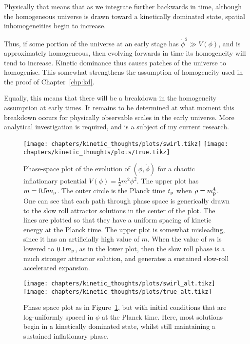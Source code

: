 Physically that means that as we integrate further backwards in time, although the homogeneous universe is drawn toward a kinetically dominated state, spatial inhomogeneities begin to increase.

Thus, if some portion of the universe at an early stage has \(\dot{\phi}^2 \gg V(\phi)\), and is approximately homogeneous, then evolving forwards in time its homogeneity will tend to increase. Kinetic dominance thus causes patches of the universe to homogenise. This somewhat strengthens the assumption of homogeneity used in the proof of Chapter~\ref{chp:kd}.

Equally, this means that there will be a breakdown in the homogeneity assumption at early times. It remains to be determined at what moment this breakdown occurs for physically observable scales in the early universe. More analytical investigation is required, and is a subject of my current research.


\begin{figure}[tp]
  \centering
  \texttt{[image: chapters/kinetic\_thoughts/plots/swirl.tikz]}
  \texttt{[image: chapters/kinetic\_thoughts/plots/true.tikz]}
  \caption{Phase-space plot of the evolution of \((\phi,\dot{\phi})\) for a chaotic inflationary potential \(V(\phi) = \frac{1}{2}m^2 \phi^2\). The upper plot has \(m=0.5m_{\mathrm{p}}\). The outer circle is the Planck time \(t_{\mathrm{p}}\) when \(\rho=m_{\mathrm{p}}^4\). One can see that each path through phase space is generically drawn to the slow roll attractor solutions in the center of the plot. The lines are plotted so that they have a uniform spacing of kinetic energy at the Planck time.  The upper plot is somewhat misleading, since it has an artificially high value of \(m\). When the value of \(m\) is lowered to \(0.1m_{\mathrm{p}}\), as in the lower plot, then the slow roll phase is a much stronger attractor solution, and generates a sustained slow-roll accelerated expansion.}\label{fig:kt:linde}
\end{figure}

\begin{figure}[tp]
  \centering
  \texttt{[image: chapters/kinetic\_thoughts/plots/swirl\_alt.tikz]}
  \texttt{[image: chapters/kinetic\_thoughts/plots/true\_alt.tikz]}
  \caption{Phase space plot as in Figure~\protect\ref{fig:kt:linde}, but with initial conditions that are log-uniformly spaced in \(\phi\) at the Planck time. Here, most solutions begin in a kinetically dominated state, whilst still maintaining a sustained inflationary phase.}\label{fig:kt:alternate}
\end{figure}
